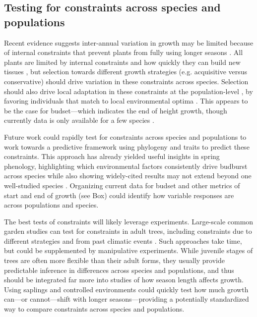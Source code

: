 \documentclass[11pt]{article}
\begin{document}
\subsection*{Testing for constraints across species and populations} %

Recent evidence suggests inter-annual variation in growth may be limited because of internal constraints that prevent plants from fully using longer seasons \citep{zohner2023effect}. All plants are limited by internal constraints and how quickly they can build new tissues \citep{marchand2021timing,luo2024internal}, but selection towards different growth strategies (e.g. acquisitive versus conservative) should drive variation in these constraints across species. Selection should also drive local adaptation in these constraints at the population-level \citep{mckown2016impacts,soolanayakanahally2013timing}, by favoring individuals that match to local environmental optima \citep{Colautti:2010,mckown2014np}. This appears to be the case for budset---which indicates the end of height growth, though currently data is only available for a few species \citep{aitken2016,zeng2024weak}. 

Future work could rapidly test for constraints across species and populations to work towards a predictive framework using phylogeny and traits to predict these constraints. This approach has already yielded useful insights in spring phenology, highlighting which environmental factors consistently drive budburst across species while also showing widely-cited results may not extend beyond one well-studied species \citep{morales2024phylogenetic}. Organizing current data for budset and other metrics of start and end of growth (see Box) could identify how variable responses are across populations and species. 

The best tests of constraints will likely leverage experiments. Large-scale common garden studies can test for constraints in adult trees, including constraints due to different strategies and from past climatic events \citep[e.g., by selecting species with different growth strategies and/or selecting populations within a species with varying past exposure to damaging early season frosts][]{charrier2015effects,tixier2020comparison}. Such approaches take time, but could be supplemented by manipulative experiments. While juvenile stages of trees are often more flexible than their adult forms, they usually provide predictable inference in differences across species and populations, and thus should be integrated far more into studies of how season length affects growth. Using saplings and controlled environments could quickly test how much growth can---or cannot---shift with longer seasons---providing a potentially standardized way to compare constraints across species and populations. 
\end{document}

